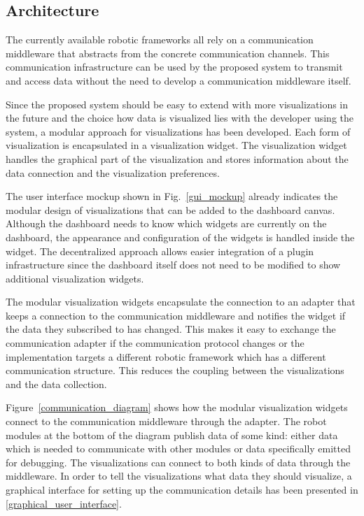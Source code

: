 
\subsection{Architecture}
The currently available robotic frameworks all rely on a communication middleware that abstracts from the concrete communication channels. This communication infrastructure can be used by the proposed system to transmit and access data without the need to develop a communication middleware itself.

Since the proposed system should be easy to extend with more visualizations in the future and the choice how data is visualized lies with the developer using the system, a modular approach for visualizations has been developed. Each form of visualization is encapsulated in a visualization widget. The visualization widget handles the graphical part of the visualization and stores information about the data connection and the visualization preferences.

The user interface mockup shown in \q Fig.~\ref{gui_mockup} already indicates the modular design of visualizations that can be added to the dashboard canvas. Although the dashboard needs to know which widgets are currently on the dashboard, the appearance and configuration of the widgets is handled inside the widget. The decentralized approach allows easier integration of a plugin infrastructure since the dashboard itself does not need to be modified to show additional visualization widgets.

The modular visualization widgets encapsulate the connection to an adapter that keeps a connection to the communication middleware and notifies the widget if the data they subscribed to has changed. This makes it easy to exchange the communication adapter if the communication protocol changes or the implementation targets a different robotic framework which has a different communication structure. This reduces the coupling between the visualizations and the data collection.

Figure~\ref{communication_diagram} shows how the modular visualization widgets connect to the communication middleware through the adapter. The robot modules at the bottom of the diagram publish data of some kind: either data which is needed to communicate with other modules or data specifically emitted for debugging. The visualizations can connect to both kinds of data through the middleware.
In order to tell the visualizations what data they should visualize, a graphical interface for setting up the communication details has been presented in \ref{graphical_user_interface}. \q

